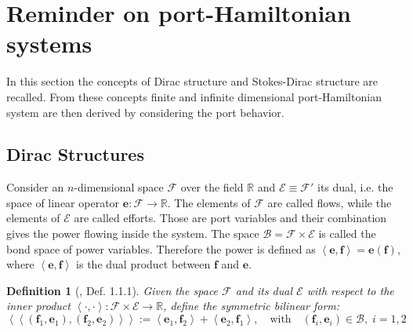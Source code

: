 \documentclass[11t]{article}
\newtheorem{definition}{Definition}
\begin{document}
	
	{
		\section{Reminder on port-Hamiltonian systems}
		In this section the concepts of Dirac structure and Stokes-Dirac structure are recalled. From these concepts finite and infinite dimensional port-Hamiltonian system are then derived by considering the port behavior. 
		\subsection{Dirac Structures}
		Consider an $n$-dimensional space $\mathcal{F}$ over the field $\mathbb{R}$ and $\mathcal{E} \equiv \mathcal{F}'$ its dual, i.e. the space of linear operator $\bm{e} : \mathcal{F} \rightarrow \mathbb{R}$. The elements of $\mathcal{F}$ are called flows, while the elements of $\mathcal{E}$ are called efforts. Those are port variables and their combination gives the power flowing inside the system. The space $\mathcal{B} = \mathcal{F} \times \mathcal{E}$ is called the bond space of power variables. Therefore the power is defined as  $\left\langle \bm{e}, \bm{f} \right\rangle = \bm{e}(\bm{f})$, where $\left\langle \bm{e} , \bm{f} \right\rangle$ is the dual product between $\bm{f}$ and $\bm{e}$.
		\begin{definition}[\cite{CourantDiracStructure}, Def. 1.1.1]
			Given the space $\mathcal{F}$ and its dual $\mathcal{E}$ with respect to the inner product $\left\langle \cdot , \cdot \right\rangle : \mathcal{F} \times \mathcal{E} \rightarrow \mathbb{R}$, define the symmetric bilinear form:
			\begin{equation}
			\left\langle \left\langle (\bm{f}_1, \bm{e}_1), (\bm{f}_2, \bm{e}_2) \right\rangle \right\rangle := \left\langle \bm{e}_1, \bm{f}_2 \right\rangle +  \left\langle \bm{e}_2, \bm{f}_1 \right\rangle, \quad \text{with} \quad (\bm{f}_i, \bm{e}_i) \in \mathcal{B}, \; i = 1, 2
			\end{equation}
			

\end{definition}}
\end{document}
